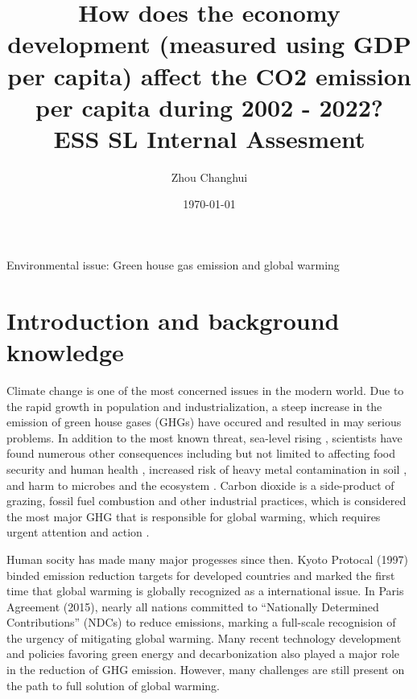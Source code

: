 \documentclass[a4paper]{article}
\begin{document}
\begin{titlepage}
    \title{\textbf{How does the economy development (measured using GDP per capita) affect the CO2 emission per capita during 2002 - 2022? \\ \small ESS SL Internal Assesment}}
    \author{Zhou Changhui}
    \date{\today}
    \maketitle
    Environmental issue: Green house gas emission and global warming
\end{titlepage}

\section{Introduction and background knowledge}

Climate change is one of the most concerned issues in the modern world. Due to the rapid growth in population and industrialization, a steep increase in the emission of green house gases (GHGs) have occured and resulted in may serious problems. In addition to the most known threat, sea-level rising \cite{hansen2013climate}, scientists have found numerous other consequences including but not limited to affecting food security and human health \cite{co2foodhumanhealth}, increased risk of heavy metal contamination in soil \cite{co2heavymetal}, and harm to microbes and the ecosystem \cite{co2microbes}. Carbon dioxide is a side-product of grazing, fossil fuel combustion and other industrial practices, which is considered the most major GHG that is responsible for global warming, which requires urgent attention and action \cite{solomon2009irreversible}. 

Human socity has made many major progesses since then. Kyoto Protocal (1997) binded emission reduction targets for developed countries and marked the first time that global warming is globally recognized as a international issue. In Paris Agreement (2015), nearly all nations committed to “Nationally Determined Contributions” (NDCs) to reduce emissions, marking a full-scale recognision of the urgency of mitigating global warming. Many recent technology development and policies favoring green energy and decarbonization also played a major role in the reduction of GHG emission. However, many challenges are still present on the path to full solution of global warming. %
\end{document}
